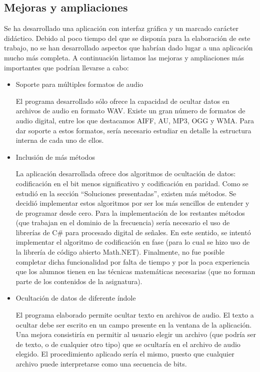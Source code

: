 \documentclass[12pt]{article}
\begin{document}
\subsection{Mejoras y ampliaciones}

Se ha desarrollado una aplicación con interfaz gráfica y un marcado carácter didáctico. Debido al poco tiempo del que se disponía para la elaboración de este trabajo, no se han desarrollado aspectos que habrían dado lugar a una aplicación mucho más completa. A continuación listamos las mejoras y ampliaciones más importantes que podrían llevarse a cabo:

\begin{itemize}

\item Soporte para múltiples formatos de audio

El programa desarrollado sólo ofrece la capacidad de ocultar datos en archivos de audio en formato WAV. Existe un gran número de formatos de audio digital, entre los que destacamos AIFF, AU, MP3, OGG y WMA. Para dar soporte a estos formatos, sería necesario estudiar en detalle la estructura interna de cada uno de ellos.

\item Inclusión de más métodos

La aplicación desarrollada ofrece dos algoritmos de ocultación de datos: codificación en el bit menos significativo y codificación en paridad. Como se estudió en la sección ``Soluciones presentadas'', existen más métodos. Se decidió implementar estos algoritmos por ser los más sencillos de entender y de programar desde cero. Para la implementación de los restantes métodos (que trabajan en el dominio de la frecuencia) sería necesario el uso de librerías de C\# para procesado digital de señales. En este sentido, se intentó implementar el algoritmo de codificación en fase (para lo cual se hizo uso de la librería de código abierto Math.NET). Finalmente, no fue posible completar dicha funcionalidad por falta de tiempo y por la poca experiencia que los alumnos tienen en las técnicas matemáticas necesarias (que no forman parte de los contenidos de la asignatura).

\item Ocultación de datos de diferente índole

El programa elaborado permite ocultar texto en archivos de audio. El texto a ocultar debe ser escrito en un campo presente en la ventana de la aplicación. Una mejora consistiría en permitir al usuario elegir un archivo (que podría ser de texto, o de cualquier otro tipo) que se ocultaría en el archivo de audio elegido. El procedimiento aplicado sería el mismo, puesto que cualquier archivo puede interpretarse como una secuencia de bits.

\end{itemize}
\end{document}
